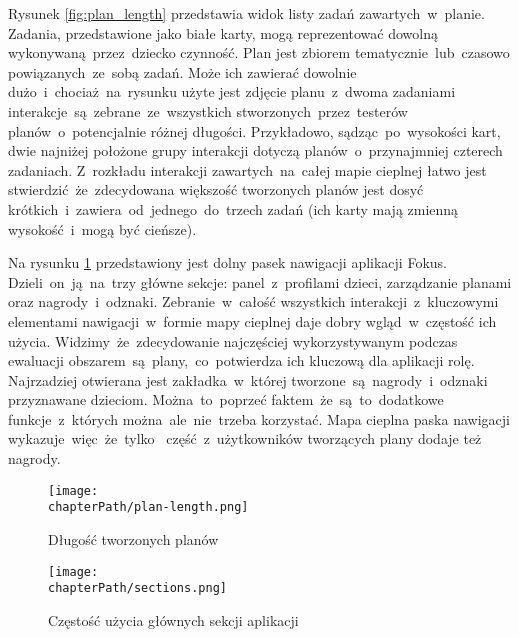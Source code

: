 Rysunek \ref{fig:plan_length} przedstawia widok listy zadań zawartych~w~planie. Zadania, przedstawione jako białe karty, mogą reprezentować dowolną wykonywaną~przez~dziecko czynność. Plan jest zbiorem tematycznie~lub~czasowo powiązanych~ze~sobą zadań. Może ich zawierać dowolnie dużo~i~chociaż~na~rysunku użyte jest zdjęcie planu~z~dwoma zadaniami interakcje~są~zebrane~ze~wszystkich stworzonych~przez~testerów planów~o~potencjalnie różnej długości. Przykładowo, sądząc~po~wysokości kart, dwie najniżej położone grupy interakcji dotyczą planów~o~przynajmniej czterech zadaniach. Z~rozkładu interakcji zawartych~na~całej mapie cieplnej łatwo jest stwierdzić~że~zdecydowana większość tworzonych planów jest dosyć krótkich~i~zawiera~od~jednego~do~trzech zadań (ich karty mają zmienną wysokość~i~mogą być cieńsze).

Na rysunku \ref{fig:sections_usage} przedstawiony jest dolny pasek nawigacji aplikacji Fokus. Dzieli~on~ją~na~trzy główne sekcje: panel~z~profilami dzieci, zarządzanie planami oraz nagrody~i~odznaki. Zebranie~w~całość wszystkich interakcji~z~kluczowymi elementami nawigacji~w~formie mapy cieplnej daje dobry wgląd~w~częstość ich użycia. Widzimy~że~zdecydowanie najczęściej wykorzystywanym podczas ewaluacji obszarem~są~plany,~co~potwierdza ich kluczową dla aplikacji rolę. Najrzadziej otwierana jest zakładka~w~której tworzone~są~nagrody~i~odznaki przyznawane dzieciom. Można~to~poprzeć faktem~że~są~to~dodatkowe funkcje~z~których można~ale~nie~trzeba korzystać. Mapa cieplna paska nawigacji wykazuje~więc~że~tylko~ część~z~użytkowników tworzących plany dodaje też nagrody.

\bigskip
\begin{figure}[H]
\centering
\begin{minipage}{.4\textwidth}
	\centering
	\texttt{[image: \\chapterPath/plan-length.png]}
	\bigskip
	\caption{Długość tworzonych planów}
	\label{fig:plan_length}
\end{minipage}
\begin{minipage}{.55\textwidth}
	\centering
	\texttt{[image: \\chapterPath/sections.png]}
	\bigskip
	\caption{Częstość użycia głównych sekcji aplikacji}
	\label{fig:sections_usage}
\end{minipage}
\end{figure}
